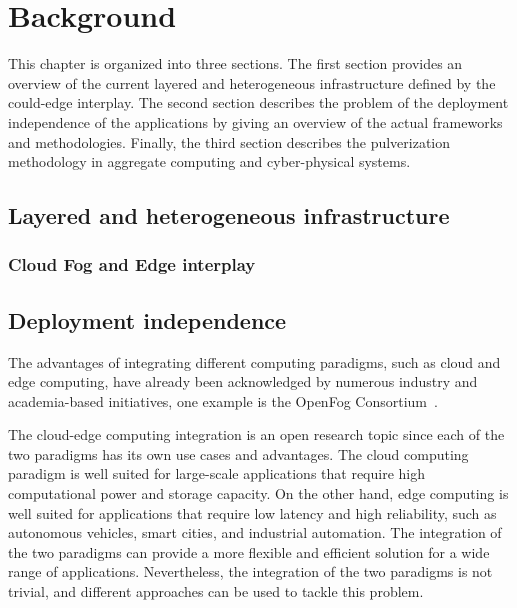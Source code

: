 \chapter{Background}
\label{chap:background}

This chapter is organized into three sections. The first section provides an overview of the current layered and heterogeneous infrastructure
defined by the could-edge interplay. The second section describes the problem of the deployment independence of the applications by giving an
overview of the actual frameworks and methodologies. Finally, the third section describes the pulverization methodology in aggregate computing and
cyber-physical systems.

\section{Layered and heterogeneous infrastructure}
\label{sec:layered-heterogeneous-infrastructure}

\subsection{Cloud Fog and Edge interplay}
\label{sec:cloud-fog-edge-interplay}


\section{Deployment independence}
\label{sec:deployment-independence}

The advantages of integrating different computing paradigms, such as cloud and edge computing, have already been acknowledged by numerous
industry and academia-based initiatives, one example is the OpenFog Consortium~\cite{opc}.

The cloud-edge computing integration is an open research topic since each of the two paradigms has its own use cases and advantages. The cloud
computing paradigm is well suited for large-scale applications that require high computational power and storage capacity. On the other hand, edge
computing is well suited for applications that require low latency and high reliability, such as autonomous vehicles, smart cities, and industrial
automation. The integration of the two paradigms can provide a more flexible and efficient solution for a wide range of applications.
Nevertheless, the integration of the two paradigms is not trivial, and different approaches can be used to tackle this problem.


